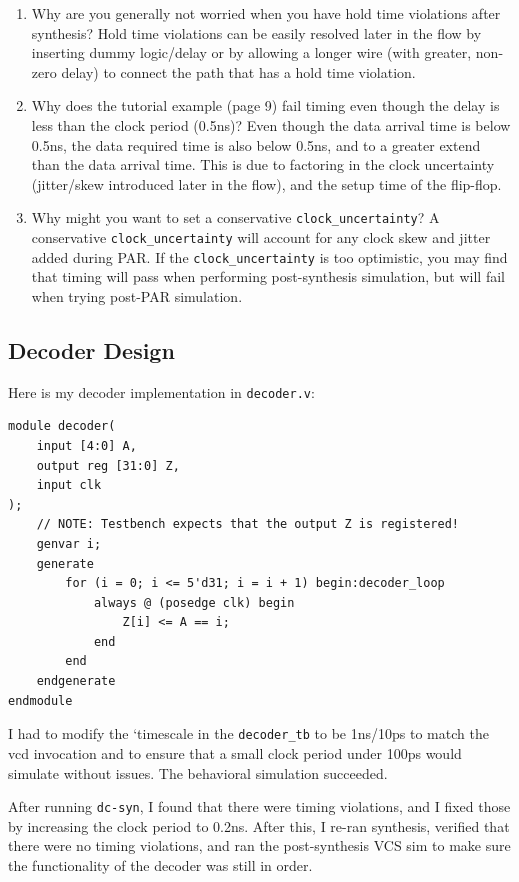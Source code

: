 \documentclass[11pt]{article}
\begin{document}
\begin{enumerate}
	\item Why are you generally not worried when you have hold time violations after synthesis?
	Hold time violations can be easily resolved later in the flow by inserting dummy logic/delay or by allowing a longer wire (with greater, non-zero delay) to connect the path that has a hold time violation.
	
	\item Why does the tutorial example (page 9) fail timing even though the delay is less than the clock period (0.5ns)?
	Even though the data arrival time is below 0.5ns, the data required time is also below 0.5ns, and to a greater extend than the data arrival time. This is due to factoring in the clock uncertainty (jitter/skew introduced later in the flow), and the setup time of the flip-flop.
	
	\item Why might you want to set a conservative \verb|clock_uncertainty|?
	A conservative \verb|clock_uncertainty| will account for any clock skew and jitter added during PAR. If the \verb|clock_uncertainty| is too optimistic, you may find that timing will pass when performing post-synthesis simulation, but will fail when trying post-PAR simulation.
\end{enumerate}

\subsection{Decoder Design}

Here is my decoder implementation in \verb|decoder.v|:

\begin{verbatim}
module decoder(
	input [4:0] A,
	output reg [31:0] Z,
	input clk
);
	// NOTE: Testbench expects that the output Z is registered!
	genvar i;
	generate
		for (i = 0; i <= 5'd31; i = i + 1) begin:decoder_loop
			always @ (posedge clk) begin
				Z[i] <= A == i;
			end
		end
	endgenerate
endmodule
\end{verbatim}

I had to modify the `timescale in the \verb|decoder_tb| to be 1ns/10ps to match the vcd invocation and to ensure that a small clock period under 100ps would simulate without issues. The behavioral simulation succeeded.

After running \verb|dc-syn|, I found that there were timing violations, and I fixed those by increasing the clock period to 0.2ns. After this, I re-ran synthesis, verified that there were no timing violations, and ran the post-synthesis VCS sim to make sure the functionality of the decoder was still in order.
\end{document}
